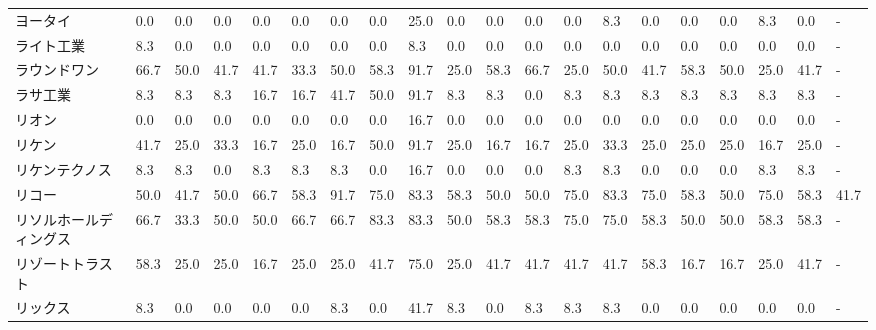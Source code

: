 \documentclass[a4paper，11pt]{jsarticle}
\begin{document}
\begin{longtable}[c]{lp{3mm}p{3mm}p{3mm}p{3mm}p{3mm}p{3mm}p{3mm}p{3mm}p{3mm}p{3mm}p{3mm}p{3mm}p{3mm}p{3mm}p{3mm}p{3mm}p{3mm}p{3mm}p{3mm}}
ヨータイ            &    0.0 &    0.0 &       0.0 &       0.0 &        0.0 &    0.0 &    0.0 &   25.0 &     0.0 &     0.0 &    0.0 &   0.0 &    8.3 &     0.0 &     0.0 &   0.0 &   8.3 &   0.0 &     - \\
ライト工業           &    8.3 &    0.0 &       0.0 &       0.0 &        0.0 &    0.0 &    0.0 &    8.3 &     0.0 &     0.0 &    0.0 &   0.0 &    0.0 &     0.0 &     0.0 &   0.0 &   0.0 &   0.0 &     - \\
ラウンドワン          &   66.7 &   50.0 &      41.7 &      41.7 &       33.3 &   50.0 &   58.3 &   91.7 &    25.0 &    58.3 &   66.7 &  25.0 &   50.0 &    41.7 &    58.3 &  50.0 &  25.0 &  41.7 &     - \\
ラサ工業            &    8.3 &    8.3 &       8.3 &      16.7 &       16.7 &   41.7 &   50.0 &   91.7 &     8.3 &     8.3 &    0.0 &   8.3 &    8.3 &     8.3 &     8.3 &   8.3 &   8.3 &   8.3 &     - \\
リオン             &    0.0 &    0.0 &       0.0 &       0.0 &        0.0 &    0.0 &    0.0 &   16.7 &     0.0 &     0.0 &    0.0 &   0.0 &    0.0 &     0.0 &     0.0 &   0.0 &   0.0 &   0.0 &     - \\
リケン             &   41.7 &   25.0 &      33.3 &      16.7 &       25.0 &   16.7 &   50.0 &   91.7 &    25.0 &    16.7 &   16.7 &  25.0 &   33.3 &    25.0 &    25.0 &  25.0 &  16.7 &  25.0 &     - \\
リケンテクノス         &    8.3 &    8.3 &       0.0 &       8.3 &        8.3 &    8.3 &    0.0 &   16.7 &     0.0 &     0.0 &    0.0 &   8.3 &    8.3 &     0.0 &     0.0 &   0.0 &   8.3 &   8.3 &     - \\
リコー             &   50.0 &   41.7 &      50.0 &      66.7 &       58.3 &   91.7 &   75.0 &   83.3 &    58.3 &    50.0 &   50.0 &  75.0 &   83.3 &    75.0 &    58.3 &  50.0 &  75.0 &  58.3 &  41.7 \\
リソルホールディングス     &   66.7 &   33.3 &      50.0 &      50.0 &       66.7 &   66.7 &   83.3 &   83.3 &    50.0 &    58.3 &   58.3 &  75.0 &   75.0 &    58.3 &    50.0 &  50.0 &  58.3 &  58.3 &     - \\
リゾートトラスト        &   58.3 &   25.0 &      25.0 &      16.7 &       25.0 &   25.0 &   41.7 &   75.0 &    25.0 &    41.7 &   41.7 &  41.7 &   41.7 &    58.3 &    16.7 &  16.7 &  25.0 &  41.7 &     - \\
リックス            &    8.3 &    0.0 &       0.0 &       0.0 &        0.0 &    8.3 &    0.0 &   41.7 &     8.3 &     0.0 &    8.3 &   8.3 &    8.3 &     0.0 &     0.0 &   0.0 &   0.0 &   0.0 &     - \\

\end{longtable}
\end{document}

